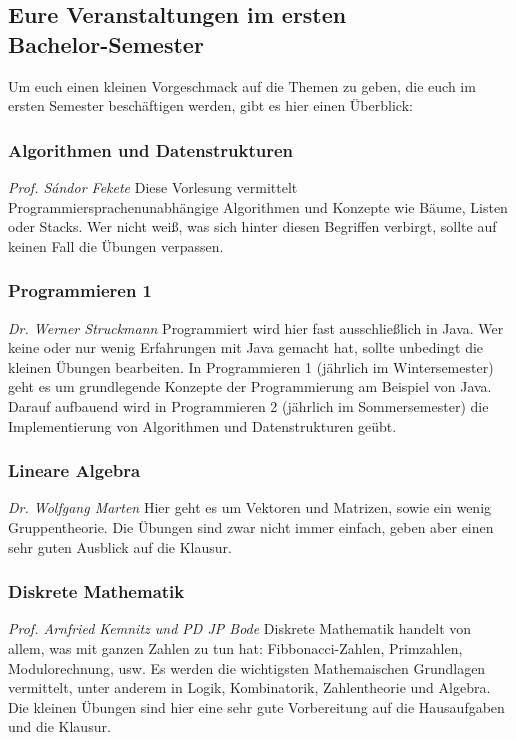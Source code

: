 \subsection{Eure Veranstaltungen im ersten \\ Bachelor-Semester}
	Um euch einen kleinen Vorgeschmack auf die Themen zu geben, die euch im ersten Semester beschäftigen werden, gibt es hier einen Überblick:

\subsubsection{Algorithmen und Datenstrukturen}
	\textit{Prof. S\'andor Fekete}
	Diese Vorlesung vermittelt Programmiersprachenunabhängige Algorithmen und Konzepte wie Bäume, Listen oder Stacks. Wer nicht weiß, was sich hinter diesen Begriffen verbirgt, sollte auf keinen Fall die Übungen verpassen.

\subsubsection{Programmieren 1}
	\textit{Dr. Werner Struckmann}
	Programmiert wird hier fast ausschließlich in Java. Wer keine oder nur wenig Erfahrungen mit Java gemacht hat, sollte unbedingt die kleinen Übungen bearbeiten.
	In Programmieren 1 (jährlich im Wintersemester) geht es um grundlegende Konzepte der Programmierung am Beispiel von Java. Darauf aufbauend wird in Programmieren 2 (jährlich im 	Sommersemester) die Implementierung von Algorithmen und Datenstrukturen geübt. 

\subsubsection{Lineare Algebra}
	\textit{Dr. Wolfgang Marten}
	Hier geht es um Vektoren und Matrizen, sowie ein wenig Gruppentheorie. Die Übungen sind zwar nicht immer einfach, geben aber einen sehr guten Ausblick auf die Klausur.

\subsubsection{Diskrete Mathematik}
	\textit{Prof. Arnfried Kemnitz und PD JP Bode}
	Diskrete Mathematik handelt von allem, was mit ganzen Zahlen zu tun hat: Fibbonacci-Zahlen, Primzahlen, Modulorechnung, usw. Es werden die wichtigsten Mathemaischen Grundlagen vermittelt, unter anderem in Logik, Kombinatorik, Zahlentheorie und Algebra. Die kleinen Übungen sind hier eine sehr gute Vorbereitung auf die Hausaufgaben und die Klausur.

